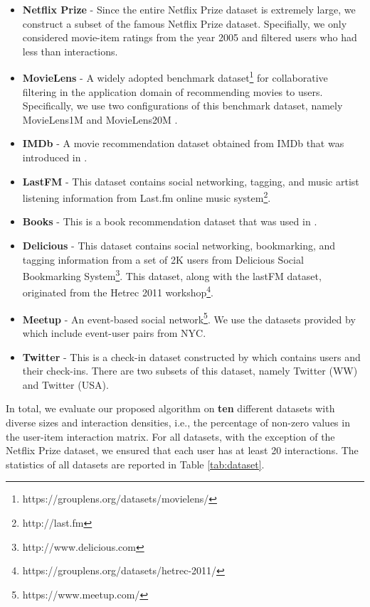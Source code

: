 \documentclass[sigconf]{acmart}
\begin{document}
\begin{itemize}
\item \textbf{Netflix Prize} - Since the entire Netflix Prize dataset is extremely large, we construct a subset of the famous Netflix Prize dataset. Specifially, we only considered movie-item ratings from the year 2005 and filtered users who had less than  interactions. 
\item \textbf{MovieLens} - A widely adopted benchmark dataset\footnote{https://grouplens.org/datasets/movielens/} for collaborative filtering in the application domain of recommending movies to users. Specifically, we use two configurations of this benchmark dataset, namely MovieLens1M and MovieLens20M \cite{DBLP:journals/tiis/HarperK16}. 
\item \textbf{IMDb} - A movie recommendation dataset obtained from IMDb that was introduced in \cite{DBLP:conf/kdd/DiaoQWSJW14}.
\item \textbf{LastFM} - This dataset contains social networking, tagging, and music artist listening information 
    from Last.fm online music system\footnote{http://last.fm}. 
\item \textbf{Books} - This is a book recommendation dataset that was used in \cite{DBLP:conf/www/ZieglerMKL05}. 
\item \textbf{Delicious} - This dataset contains social networking, bookmarking, and tagging information 
    from a set of 2K users from Delicious Social Bookmarking System\footnote{http://www.delicious.com}. This dataset, along with the lastFM dataset, originated from the Hetrec 2011 workshop\footnote{https://grouplens.org/datasets/hetrec-2011/}.
\item \textbf{Meetup} - An event-based social network\footnote{https://www.meetup.com/}. We use the datasets provided by \cite{DBLP:conf/icde/PhamLCZ15} which include event-user pairs from NYC.
\item \textbf{Twitter} - This is a check-in dataset constructed by \cite{DBLP:conf/kdd/YuanCMSM13} which contains users and their check-ins. There are two subsets of this dataset, namely Twitter (WW) and Twitter (USA).  
\end{itemize}
In total, we evaluate our proposed algorithm on \textbf{ten} different datasets with diverse sizes and interaction densities, i.e., the percentage of non-zero values in the user-item interaction matrix. For all datasets, with the exception of the Netflix Prize dataset, we ensured that each user has at least 20 interactions. The statistics of all datasets are reported in Table \ref{tab:dataset}.
\end{document}
